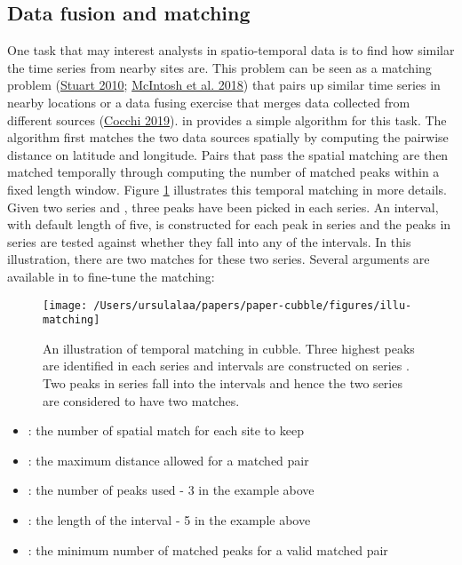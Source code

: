 \documentclass{article}
\providecommand{\tightlist}{%
  \setlength{\itemsep}{0pt}\setlength{\parskip}{0pt}}
\begin{document}
\hypertarget{data-fusion-and-matching}{%
\subsection{Data fusion and matching}\label{data-fusion-and-matching}}

One task that may interest analysts in spatio-temporal data is to find how similar the time series from nearby sites are. This problem can be seen as a matching problem (\protect\hyperlink{ref-stuart2010matching}{Stuart 2010}; \protect\hyperlink{ref-mcintosh2018using}{McIntosh et al. 2018}) that pairs up similar time series in nearby locations or a data fusing exercise that merges data collected from different sources (\protect\hyperlink{ref-cocchi2019data}{Cocchi 2019}).  in  provides a simple algorithm for this task. The algorithm first matches the two data sources spatially by computing the pairwise distance on latitude and longitude. Pairs that pass the spatial matching are then matched temporally through computing the number of matched peaks within a fixed length window. Figure \ref{fig:illu-matching} illustrates this temporal matching in more details. Given two series  and , three peaks have been picked in each series. An interval, with default length of five, is constructed for each peak in series  and the peaks in series  are tested against whether they fall into any of the intervals. In this illustration, there are two matches for these two series. Several arguments are available in  to fine-tune the matching:

\begin{figure}
\texttt{[image: /Users/ursulalaa/papers/paper-cubble/figures/illu-matching]} \caption{An illustration of temporal matching in cubble. Three highest peaks are identified in each series and intervals are constructed on series . Two peaks in series  fall into the intervals and hence the two series are considered to have two matches.}\label{fig:illu-matching}
\end{figure}

\begin{itemize}
\tightlist
\item
  : the number of spatial match for each site to keep
\item
  : the maximum distance allowed for a matched pair
\item
  : the number of peaks used - 3 in the example above
\item
  : the length of the interval - 5 in the example above
\item
  : the minimum number of matched peaks for a valid matched pair
\end{itemize}
\end{document}
